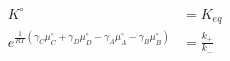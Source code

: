 \begin{eqnarray}
K^\circ & = K_{eq} \\
e^{\frac{1}{RT}\left(\gamma_C\mu_C^\circ+ \gamma_D\mu_D^\circ -\gamma_A\mu_A^\circ-\gamma_B\mu_B^\circ\right)}&  = \frac{k_+}{k_-}
\end{eqnarray}